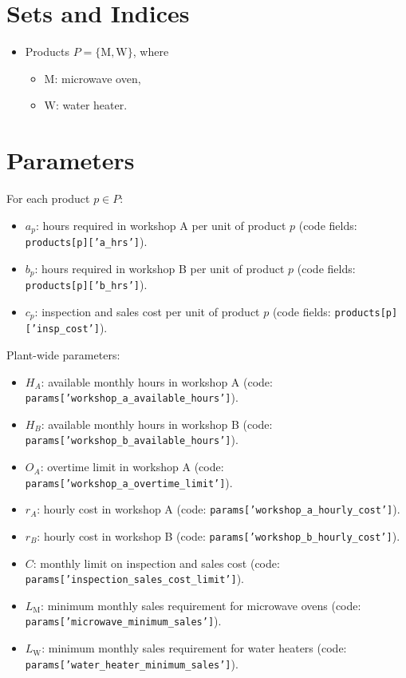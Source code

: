 \section*{Sets and Indices}

\begin{itemize}
    \item Products \(P = \{\mathrm{M}, \mathrm{W}\}\), where
    \begin{itemize}
        \item \(\mathrm{M}\): microwave oven,
        \item \(\mathrm{W}\): water heater.
    \end{itemize}
\end{itemize}

\section*{Parameters}

For each product \(p \in P\):

\begin{itemize}
    \item \(a_p\): hours required in workshop A per unit of product \(p\)
    (code fields: \texttt{products[p]['a\_hrs']}).
    \item \(b_p\): hours required in workshop B per unit of product \(p\)
    (code fields: \texttt{products[p]['b\_hrs']}).
    \item \(c_p\): inspection and sales cost per unit of product \(p\)
    (code fields: \texttt{products[p]['insp\_cost']}).
\end{itemize}

Plant-wide parameters:

\begin{itemize}
    \item \(H_A\): available monthly hours in workshop A
    (code: \texttt{params['workshop\_a\_available\_hours']}).
    \item \(H_B\): available monthly hours in workshop B
    (code: \texttt{params['workshop\_b\_available\_hours']}).
    \item \(O_A\): overtime limit in workshop A
    (code: \texttt{params['workshop\_a\_overtime\_limit']}).
    \item \(r_A\): hourly cost in workshop A
    (code: \texttt{params['workshop\_a\_hourly\_cost']}).
    \item \(r_B\): hourly cost in workshop B
    (code: \texttt{params['workshop\_b\_hourly\_cost']}).
    \item \(C\): monthly limit on inspection and sales cost
    (code: \texttt{params['inspection\_sales\_cost\_limit']}).
    \item \(L_{\mathrm{M}}\): minimum monthly sales requirement for microwave ovens
    (code: \texttt{params['microwave\_minimum\_sales']}).
    \item \(L_{\mathrm{W}}\): minimum monthly sales requirement for water heaters
    (code: \texttt{params['water\_heater\_minimum\_sales']}).
\end{itemize}


